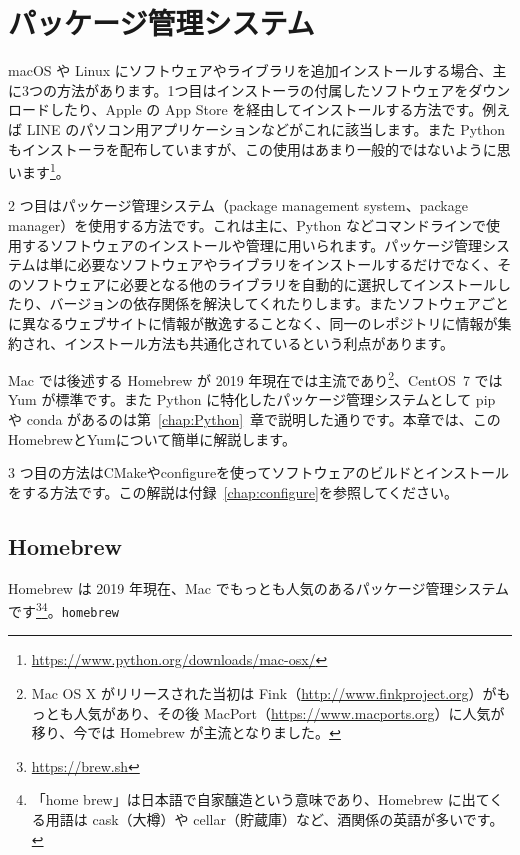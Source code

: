 \setcounter{chapter}{0}
\renewcommand{\thechapter}{\Alph{chapter}}
\setcounter{equation}{0}
\renewcommand{\theequation}{\Alph{chapter}.\arabic{equation}}
\setcounter{figure}{0}
\renewcommand{\thefigure}{\Alph{chapter}.\arabic{figure}}
\setcounter{table}{0}
\renewcommand{\thetable}{\Alph{chapter}.\arabic{table}}
\appendix

\chapter{パッケージ管理システム}
\label{chap:package}
macOS や Linux にソフトウェアやライブラリを追加インストールする場合、主に3つの方法があります。1つ目はインストーラの付属したソフトウェアをダウンロードしたり、Apple の App Store を経由してインストールする方法です。例えば LINE のパソコン用アプリケーションなどがこれに該当します。また Python もインストーラを配布していますが、この使用はあまり一般的ではないように思います\footnote{\url{https://www.python.org/downloads/mac-osx/}}。

2 つ目はパッケージ管理システム（package management system、package manager）を使用する方法です。これは主に、Python などコマンドラインで使用するソフトウェアのインストールや管理に用いられます。パッケージ管理システムは単に必要なソフトウェアやライブラリをインストールするだけでなく、そのソフトウェアに必要となる他のライブラリを自動的に選択してインストールしたり、バージョンの依存関係を解決してくれたりします。またソフトウェアごとに異なるウェブサイトに情報が散逸することなく、同一のレポジトリに情報が集約され、インストール方法も共通化されているという利点があります。

Mac では後述する Homebrew が 2019 年現在では主流であり\footnote{Mac OS X がリリースされた当初は Fink（\url{http://www.finkproject.org}）がもっとも人気があり、その後 MacPort（\url{https://www.macports.org}）に人気が移り、今では Homebrew が主流となりました。}、CentOS~7 では Yum が標準です。また Python に特化したパッケージ管理システムとして pip や conda があるのは第~\ref{chap:Python}~章で説明した通りです。本章では、このHomebrewとYumについて簡単に解説します。

3 つ目の方法はCMakeやconfigureを使ってソフトウェアのビルドとインストールをする方法です。この解説は付録~\ref{chap:configure}を参照してください。

\section{Homebrew}
\label{sec:Homebrew}
Homebrew は 2019 年現在、Mac でもっとも人気のあるパッケージ管理システムです\footnote{\url{https://brew.sh}}\footnote{「home brew」は日本語で自家醸造という意味であり、Homebrew に出てくる用語は cask（大樽）や cellar（貯蔵庫）など、酒関係の英語が多いです。}。\texttt{homebrew}

